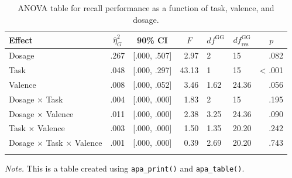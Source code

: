 \documentclass[
  english,
  ,man,floatsintext]{apa6}
\newenvironment{Shaded}{\begin{snugshade}}{\end{snugshade}}
\newcommand{\AttributeTok}[1]{\textcolor[rgb]{0.13,0.29,0.53}{#1}}
\newcommand{\DecValTok}[1]{\textcolor[rgb]{0.00,0.00,0.81}{#1}}
\newcommand{\FunctionTok}[1]{\textcolor[rgb]{0.13,0.29,0.53}{\textbf{#1}}}
\newcommand{\NormalTok}[1]{#1}
\newcommand{\SpecialCharTok}[1]{\textcolor[rgb]{0.81,0.36,0.00}{\textbf{#1}}}
\newcommand{\StringTok}[1]{\textcolor[rgb]{0.31,0.60,0.02}{#1}}
\begin{document}
\begin{table}[tbp]

\begin{center}
\begin{threeparttable}

\caption{\label{tab:anova-table}ANOVA table for recall performance as a function of task, valence, and dosage.}

\begin{tabular}{lrcrllr}
\toprule
Effect & \multicolumn{1}{c}{$\hat{\eta}^2_G$} & \multicolumn{1}{c}{90\% CI} & \multicolumn{1}{c}{$F$} & \multicolumn{1}{c}{$\mathit{df}^{\mathrm{GG}}$} & \multicolumn{1}{c}{$\mathit{df}_{\mathrm{res}}^{\mathrm{GG}}$} & \multicolumn{1}{c}{$p$}\\
\midrule
Dosage & .267 & {}[.000, .507] & 2.97 & 2 & 15 & .082\\
Task & .048 & {}[.000, .297] & 43.13 & 1 & 15 & < .001\\
Valence & .008 & {}[.000, .052] & 3.46 & 1.62 & 24.36 & .056\\ \midrule
Dosage $\times$ Task & .004 & {}[.000, .000] & 1.83 & 2 & 15 & .195\\
Dosage $\times$ Valence & .011 & {}[.000, .000] & 2.38 & 3.25 & 24.36 & .090\\
Task $\times$ Valence & .003 & {}[.000, .000] & 1.50 & 1.35 & 20.20 & .242\\ \midrule
Dosage $\times$ Task $\times$ Valence & .001 & {}[.000, .000] & 0.39 & 2.69 & 20.20 & .743\\
\bottomrule
\addlinespace
\end{tabular}

\begin{tablenotes}[para]
\normalsize{\textit{Note.} This is a table created using \texttt{apa\_print()} and \texttt{apa\_table()}.}
\end{tablenotes}

\end{threeparttable}
\end{center}

\end{table}

\begin{Shaded}
\end{Shaded}
\end{document}

